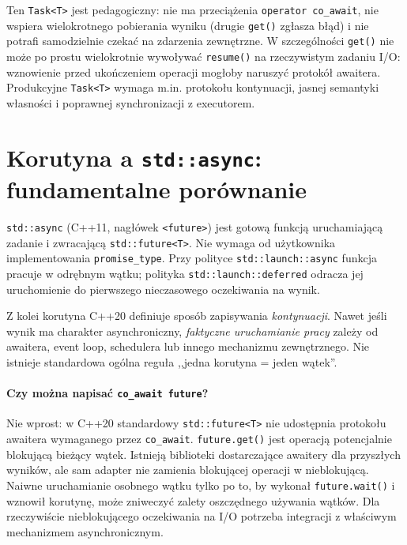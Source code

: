 Ten \texttt{Task<T>} jest pedagogiczny: nie ma przeciążenia
\texttt{operator co\_await}, nie wspiera wielokrotnego pobierania
wyniku (drugie \texttt{get()} zgłasza błąd) i nie potrafi samodzielnie
czekać na zdarzenia zewnętrzne.
W szczególności \texttt{get()} nie może po prostu wielokrotnie
wywoływać \texttt{resume()} na rzeczywistym zadaniu I/O: wznowienie
przed ukończeniem operacji mogłoby naruszyć protokół awaitera.
Produkcyjne \texttt{Task<T>} wymaga m.in. protokołu kontynuacji,
jasnej semantyki własności i poprawnej synchronizacji z executorem.

\section{Korutyna a \texttt{std::async}: fundamentalne porównanie}
\label{sec:cpp15-async-comparison}

\texttt{std::async} (C++11, nagłówek \texttt{<future>}) jest gotową
funkcją uruchamiającą zadanie i zwracającą \texttt{std::future<T>}.
Nie wymaga od użytkownika implementowania \texttt{promise\_type}.
Przy polityce \texttt{std::launch::async} funkcja pracuje w odrębnym
wątku; polityka \texttt{std::launch::deferred} odracza jej uruchomienie
do pierwszego nieczasowego oczekiwania na wynik.

Z kolei korutyna C++20 definiuje sposób zapisywania \emph{kontynuacji}.
Nawet jeśli wynik ma charakter asynchroniczny, \emph{faktyczne
uruchamianie pracy} zależy od awaitera, event loop, schedulera lub
innego mechanizmu zewnętrznego. Nie istnieje standardowa ogólna
reguła ,,jedna korutyna = jeden wątek''.


\paragraph{Czy można napisać \texttt{co\_await future}?}
Nie wprost: w C++20 standardowy \texttt{std::future<T>} nie udostępnia
protokołu awaitera wymaganego przez \texttt{co\_await}.
\texttt{future.get()} jest operacją potencjalnie blokującą
bieżący wątek. Istnieją biblioteki dostarczające awaitery dla
przyszłych wyników, ale sam adapter nie zamienia blokującej
operacji w nieblokującą. Naiwne uruchamianie osobnego wątku
tylko po to, by wykonał \texttt{future.wait()} i wznowił korutynę,
może zniweczyć zalety oszczędnego używania wątków.
Dla rzeczywiście nieblokującego oczekiwania na I/O potrzeba
integracji z właściwym mechanizmem asynchronicznym.

